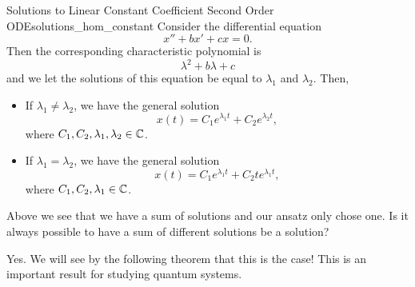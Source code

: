         \begin{prop}{Solutions to Linear Constant Coefficient Second Order ODE}{solutions_hom_constant}
        Consider the differential equation
        \[
        x''+bx'+cx=0.
        \]
        Then the corresponding characteristic polynomial is
        \[
        \lambda^2+b\lambda +c
        \]
        and we let the solutions of this equation be equal to $\lambda_1$ and $\lambda_2$. Then,
        \begin{itemize}
                \item If $\lambda_1 \neq \lambda_2$, we have the general solution
        \[
        x(t)=C_1 e^{\lambda_1t}+C_2e^{\lambda_2t},
        \]
        where $C_1,C_2,\lambda_1,\lambda_2 \in \mathbb{C}$.
            \item If $\lambda_1=\lambda_2$, we have the general solution
        \[
            x(t) = C_1 e^{\lambda_1 t} + C_2 t e^{\lambda_1 t},
        \]
        where $C_1, C_2, \lambda_1 \in \mathbb{C}$.
        \end{itemize}
        \end{prop}

        \begin{question}
        Above we see that we have a sum of solutions and our ansatz only chose one. Is it always possible to have a sum of different solutions be a solution?
        \end{question}

        \begin{answer}
        Yes. We will see by the following theorem that this is the case! This is an important result for studying quantum systems.
        \end{answer}

